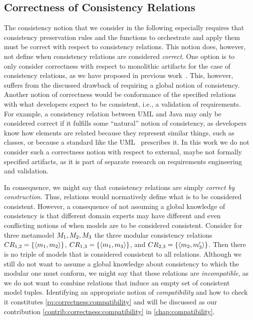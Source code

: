 \subsection{Correctness of Consistency Relations}
\label{chap:correctness:notions_correctness:relations}

The consistency notion that we consider in the following especially requires that consistency preservation rules and the functions to orchestrate and apply them must be correct with respect to consistency relations.
This notion does, however, not define when consistency relations are considered \emph{correct}.
One option is to only consider correctness with respect to monolithic artifacts for the case of consistency relations, as we have proposed in previous work~.
This, however, suffers from the discussed drawback of requiring a global notion of consistency.
Another notion of correctness would be conformance of the specified relations with what developers expect to be consistent, i.e., a validation of requirements.
For example, a consistency relation between \gls{UML} and Java may only be considered correct if it fulfills some \enquote{natural} notion of consistency, as developers know how elements are related because they represent similar things, such as classes, or because a standard like the \gls{UML}~\cite{uml} prescribes it.
In this work we do not consider such a correctness notion with respect to external, maybe not formally specified artifacts, as it is part of separate research on requirements engineering and validation.

In consequence, we might say that consistency relations are simply \emph{correct by construction}.
Thus, relations would normatively define what is to be considered consistent.
However, a consequence of not assuming a global knowledge of consistency is that different domain experts may have different and even conflicting notions of when models are to be considered consistent.
Consider for three metamodel $\metamodel{M}{1}, \metamodel{M}{2}, \metamodel{M}{3}$ the three modular consistency relations $\consistencyrelation{CR}{1,2} = \setted{\tupled{\model{m}{1},\model{m}{2}}}$, $\consistencyrelation{CR}{1,3} = \setted{\tupled{\model{m}{1},\model{m}{3}}}$, and $\consistencyrelation{CR}{2,3} = \setted{\tupled{\model{m}{2},\model{m}{3}'}}$. 
Then there is no triple of models that is considered consistent to all relations. 
Although we still do not want to assume a global knowledge about consistency to which the modular one must conform, we might say that these relations are \emph{incompatible}, as we do not want to combine relations that induce an empty set of consistent model tuples.
Identifying an appropriate notion of \emph{compatibility} and how to check it constitutes \autoref{rq:correctness:compatibility} and will be discussed as our contribution \autoref{contrib:correctness:compatibility} in \autoref{chap:compatibility}.

